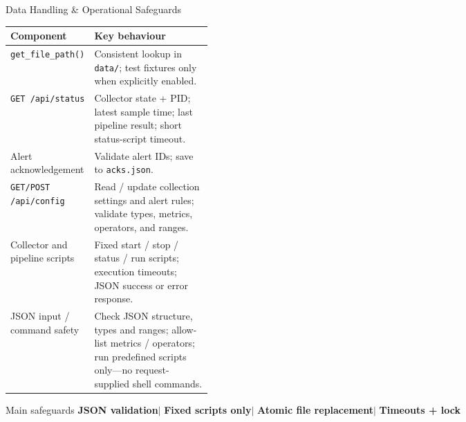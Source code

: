 \documentclass[aspectratio=169,10pt]{beamer}
\begin{document}
\begin{frame}{Data Handling \& Operational Safeguards}
\footnotesize
\begin{tabularx}{\linewidth}{@{}L{0.34\linewidth}Y@{}}
\toprule
\textbf{Component} & \textbf{Key behaviour} \\
\midrule
\texttt{get\_file\_path()}
& Consistent lookup in \texttt{data/}; test fixtures only when explicitly enabled. \\
\addlinespace[1.2mm]
\texttt{GET /api/status}
& Collector state + PID; latest sample time; last pipeline result; short status-script timeout. \\
\addlinespace[1.2mm]
Alert acknowledgement
& Validate alert IDs; save to \texttt{acks.json}. \\
\addlinespace[1.2mm]
\texttt{GET/POST /api/config}
& Read / update collection settings and alert rules; validate types, metrics, operators, and ranges. \\
\addlinespace[1.2mm]
Collector and pipeline scripts
& Fixed start / stop / status / run scripts; execution timeouts; JSON success or error response. \\
\addlinespace[1.2mm]
JSON input / command safety
& Check JSON structure, types and ranges; allow-list metrics / operators; run predefined scripts only---no request-supplied shell commands. \\
\bottomrule
\end{tabularx}

\vspace{3mm}
\begin{block}{Main safeguards}
\centering
\textbf{JSON validation}\quad $\vert$ \quad
\textbf{Fixed scripts only}\quad $\vert$ \quad
\textbf{Atomic file replacement}\quad $\vert$ \quad
\textbf{Timeouts + lock}
\end{block}
\end{frame}
\end{document}
